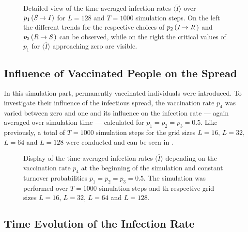 
\begin{figure}[ht]
    \centering
    \resizebox{\textwidth}{!}{}
    \caption{Detailed view of the time-averaged infection rates $\overline{\langle I\rangle}$ over $p_1\left(\textit{S}\rightarrow\textit{I}\,\right)$ for $L=128$ and $T=1000$ simulation steps. On the left the different
    trends for the respective choices of $p_2\left(\textit{I}\rightarrow\textit{R}\,\right)$ and $p_3\left(\textit{R}\rightarrow\textit{S}\,\right)$ can be observed, 
    while on the right the critical values of $p_1$ for $\overline{\langle I\rangle}$ approaching zero are visible.}\label{fig:res_dis_avg_inf_over_p1_L128}
\end{figure}


\subsection{Influence of Vaccinated People on the Spread}

In this simulation part, permanently vaccinated individuals \vaccinated{} were introduced. To investigate their influence of the infectious spread, the vaccination rate $p_4$ was varied between zero and one
and its influence on the infection rate --- again averaged over simulation time --- calculated for $p_1=p_2=p_3=0.5$. Like previously, a total of $T=1000$ simulation steps for the grid sizes 
$L=16$, $L=32$, $L=64$ and $L=128$ were conducted and can be seen in . 

\begin{figure}[ht]
    \centering
    \resizebox{\textwidth}{!}{}
    \caption{Display of the time-averaged infection rates $\overline{\langle I\rangle}$ depending on the vaccination rate $p_4$ at the beginning of the simulation and constant turnover probabilities
    $p_1=p_2=p_3=0.5$. The simulation was performed over $T=1000$ simulation steps and th respective grid sizes $L=16$, $L=32$, $L=64$ and $L=128$.}\label{fig:res_dis_avg_inf_over_p4}
\end{figure}


\subsection{Time Evolution of the Infection Rate}

